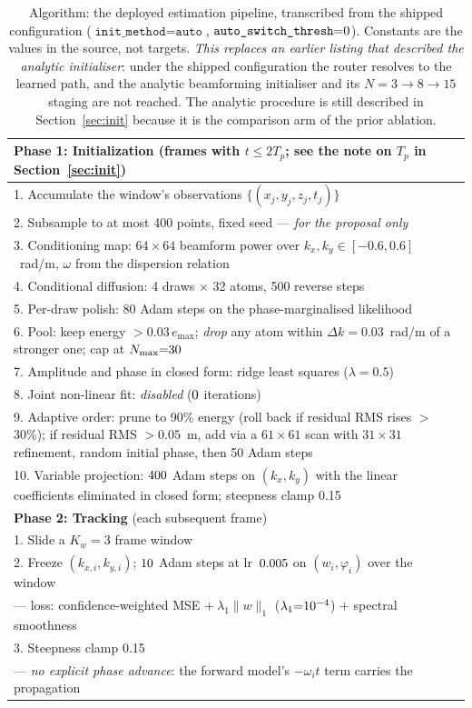 \documentclass[review]{elsarticle}
\begin{document}
\begin{table}[!htbp]
\small
\centering
\caption{Algorithm: the deployed estimation pipeline, transcribed from the
shipped configuration ($\texttt{init\_method}{=}\texttt{auto}$,
$\texttt{auto\_switch\_thresh}{=}0{}$). Constants are the
values in the source, not targets. \emph{This replaces an earlier listing that
described the analytic initialiser}: under the shipped configuration the router
resolves to the learned path, and the analytic beamforming initialiser and its
$N{=}3\to8\to15$ staging are not reached. The analytic procedure is still
described in Section~\ref{sec:init} because it is the comparison arm of the prior
ablation.}
\label{alg:wavesplat}
\begin{tabular}{p{}}
\toprule
\textbf{Phase 1: Initialization} (frames with $t \le 2T_p$; see the note on $T_p$
in Section~\ref{sec:init}) \\
\midrule
1. Accumulate the window's observations $\{(x_j, y_j, z_j, t_j)\}$ \\
2. Subsample to at most 400 points, fixed seed --- \emph{for the proposal only} \\
3. Conditioning map: $64\!\times\!64$ beamform power over $k_x, k_y \in [-0.6, 0.6]$~rad/m, $\omega$ from the dispersion relation \\
4. Conditional diffusion: 4 draws $\times$ 32 atoms, 500 reverse steps \\
5. Per-draw polish: 80 Adam steps on the phase-marginalised likelihood \\
6. Pool: keep energy $> 0.03\,e_{\max}$; \emph{drop} any atom within $\Delta k{=}0.03$~rad/m of a stronger one; cap at $N_{\max}{=}30{}$ \\
7. Amplitude and phase in closed form: ridge least squares ($\lambda{=}0.5$) \\
8. Joint non-linear fit: \emph{disabled} ($0{}$ iterations) \\
9. Adaptive order: prune to 90\% energy (roll back if residual RMS rises $>$30\%); if residual RMS $>0.05$~m, add via a $61\!\times\!61$ scan with $31\!\times\!31$ refinement, random initial phase, then 50 Adam steps \\
10. Variable projection: $400{}$ Adam steps on $(k_{x}, k_{y})$ with the linear coefficients eliminated in closed form; steepness clamp 0.15 \\
\midrule
\textbf{Phase 2: Tracking} (each subsequent frame) \\
\midrule
1. Slide a $K_w{=}3$ frame window \\
2. Freeze $(k_{x,i}, k_{y,i})$; $10{}$ Adam steps at lr~$0.005{}$ on $(w_i, \varphi_i)$ over the window \\
\quad --- loss: confidence-weighted MSE $+\ \lambda_1\|w\|_1$ ($\lambda_1{=}10^{-4}{}$) $+$ spectral smoothness \\
3. Steepness clamp 0.15 \\
\quad --- \emph{no explicit phase advance}: the forward model's $-\omega_i t$ term carries the propagation \\
\bottomrule
\end{tabular}
\end{table}
\end{document}
